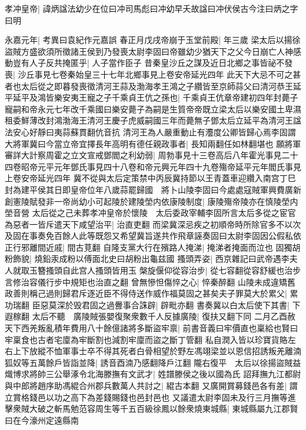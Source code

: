孝冲皇帝|{
	諱炳諡法幼少在位曰冲司馬彪曰冲幼早夭故諡曰冲伏侯古今注曰炳之字曰明}


永嘉元年|{
	考異曰袁紀作元嘉誤}
春正月戊戌帝崩于玉堂前殿|{
	年三歲}
梁太后以揚徐盜賊方盛欲須所徵諸王侯到乃發喪太尉李固曰帝雖幼少猶天下之父今日崩亡人神感動豈有人子反共掩匿乎|{
	人子當作臣子}
昔秦皇沙丘之謀及近日北鄉之事皆祕不發喪|{
	沙丘事見七卷秦始皇三十七年北鄉事見上卷安帝延光四年}
此天下大忌不可之甚者也太后從之即暮發喪徵清河王蒜及渤海孝王鴻之子纘皆至京師蒜父曰清河恭王延平延平及鴻皆樂安夷王寵之子千乘貞王伉之孫也|{
	千乘貞王伉章帝建初四年封薨子寵嗣和帝永元七年改千乘國曰樂安薨子為嗣是生質帝帝既立梁太后以樂安國土卑濕租委鮮薄改封鴻渤海王清河王慶子虎威嗣國三年而薨無子鄧太后立延平為清河王諡法安心好靜曰夷蒜蘇貫翻伉音抗}
清河王為人嚴重動止有灋度公卿皆歸心焉李固謂大將軍冀曰今當立帝宜擇長年高明有德任親政事者|{
	長知兩翻任如林翻堪也}
願將軍審詳大計察周霍之立文宣戒鄧閻之利幼弱|{
	周勃事見十三卷高后八年霍光事見二十四卷昭帝元平元年鄧氏事見四十八卷和帝元興元年四十九卷殤帝延平元年閻氏事見上卷安帝延光四年}
冀不從與太后定策禁中丙辰冀持節以王青蓋車迎纘入南宫丁巳封為建平侯其日即皇帝位年八歲蒜罷歸國　將卜山陵李固曰今處處寇賊軍興費廣新創憲陵賦發非一帝尚幼小可起陵於建陵塋内依康陵制度|{
	康陵殤帝陵亦在慎陵塋内塋音營}
太后從之己未葬孝冲皇帝於懷陵　太后委政宰輔李固所言太后多從之宦官為惡者一皆斥遣天下咸望治平|{
	治直吏翻}
而梁冀深忌疾之初順帝時所除官多不以次及固在事奏免百餘人此等既怨又希望冀旨遂共作飛章誣奏固曰太尉李固因公假私依正行邪離間近戚|{
	間古莧翻}
自隆支黨大行在殯路人掩涕|{
	掩涕者掩面而泣也}
固獨胡粉飾貌|{
	燒鉛汞成粉以傅面北史曰胡粉出龜兹國}
搔頭弄姿|{
	西京雜記曰武帝遇李夫人就取玉簪搔頭自此宫人搔頭皆用玉}
槃旋偃仰從容治步|{
	從七容翻從容舒緩也治步言修治容儀行步中規矩也治直之翻}
曾無慘怛傷悴之心|{
	悴秦醉翻}
山陵未成違矯舊政善則稱己過則歸君斥逐近臣不得侍送作威作福莫固之甚矣夫子罪莫大於累父|{
	累功瑞翻}
臣惡莫深於毁君固之過釁事合誅辟|{
	辟毗亦翻}
書奏冀以白太后使下其書|{
	下遐稼翻}
太后不聽　廣陵賊張嬰復聚衆數千人反據廣陵|{
	復扶又翻下同}
二月乙酉赦天下西羌叛亂積年費用八十餘億諸將多斷盜牢禀|{
	前書音義曰牢價直也稟給也賢曰牢稟食也古者宅廩為牢斷割也減割牢廩而盜之斷丁管翻}
私自潤入皆以珍寶貨賂左右上下放縱不恤軍事士卒不得其死者白骨相望於野左馮翊梁並以恩信招誘叛羌離湳狐奴等五萬餘戶皆詣並降|{
	誘音酉湳乃感翻降戶江翻}
隴右復平　太后以徐揚盜賊益熾博求將帥三公舉涿令北海滕撫有文武才|{
	姓譜滕侯之後以國為氏}
詔拜撫九江都尉與中郎將趙序助馮緄合州郡兵數萬人共討之|{
	緄古本翻}
又廣開賞募錢邑各有差|{
	謂立賞格錢邑以功之高下為差錢賜錢也邑封邑也}
又議遣太尉李固未及行三月撫等進擊衆賊大破之斬馬勉范容周生等千五百級徐鳳以餘衆燒東城縣|{
	東城縣屬九江郡賢曰在今濠州定遠縣南}
